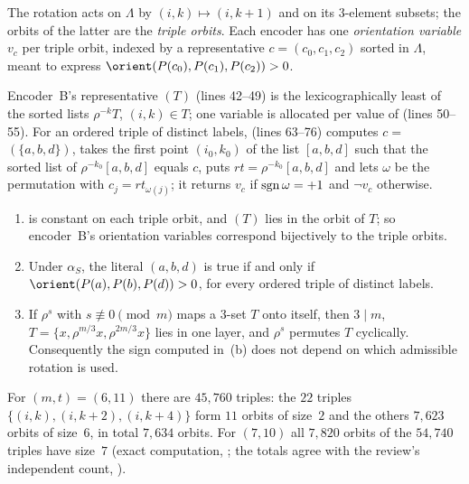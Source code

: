 \begin{definition}\label{k8s:def:orbits}
The rotation acts on $\Lambda$ by $(i,k)\mapsto(i,k+1)$ and on its $3$-element subsets; the orbits of the latter are the
\emph{triple orbits}. Each encoder has one \emph{orientation variable} $v_c$ per triple orbit, indexed by a
representative $c=(c_0,c_1,c_2)$ sorted in $\Lambda$, meant to express $\orient(P(c_0),P(c_1),P(c_2))>0$.
\end{definition}

Encoder~B's representative $(T)$ (lines 42--49) is the lexicographically least of the
sorted lists $\rho^{-k}T$, $(i,k)\in T$; one variable is allocated per value of  (lines 50--55). For an ordered
triple of distinct labels,  (lines 63--76) computes $c=$$(\{a,b,d\})$, takes the first point
$(i_0,k_0)$ of the list $[a,b,d]$ such that the sorted list of $\rho^{-k_0}[a,b,d]$ equals $c$, puts
$\mathit{rt}=\rho^{-k_0}[a,b,d]$ and lets $\omega$ be the permutation with $c_j=\mathit{rt}_{\omega(j)}$; it returns $v_c$ if
$\operatorname{sgn}\omega=+1$ and $\neg v_c$ otherwise.

\begin{lemma}\label{k8s:lem:orbit}
\begin{enumerate}[label=(\alph*)]
\item {} is constant on each triple orbit, and $(T)$ lies in the orbit of $T$; so encoder~B's
orientation variables correspond bijectively to the triple orbits.
\item Under $\alpha_S$, the literal $(a,b,d)$ is true if and only if $\orient(P(a),P(b),P(d))>0$, for every
ordered triple of distinct labels.
\item If $\rho^s$ with $s\not\equiv0\pmod m$ maps a $3$-set $T$ onto itself, then $3\mid m$, $T=\{x,\rho^{m/3}x,\rho^{2m/3}x\}$
lies in one layer, and $\rho^s$ permutes $T$ cyclically. Consequently the sign computed in~(b) does not depend on which
admissible rotation is used.
\end{enumerate}
For $(m,t)=(6,11)$ there are $45{,}760$ triples: the $22$ triples $\{(i,k),(i,k+2),(i,k+4)\}$ form $11$ orbits of
size~$2$ and the others $7{,}623$ orbits of size~$6$, in total $7{,}634$ orbits. For $(7,10)$ all $7{,}820$ orbits of
the $54{,}740$ triples have size~$7$ (exact computation, ; the totals agree with the review's
independent count, ).
\end{lemma}

